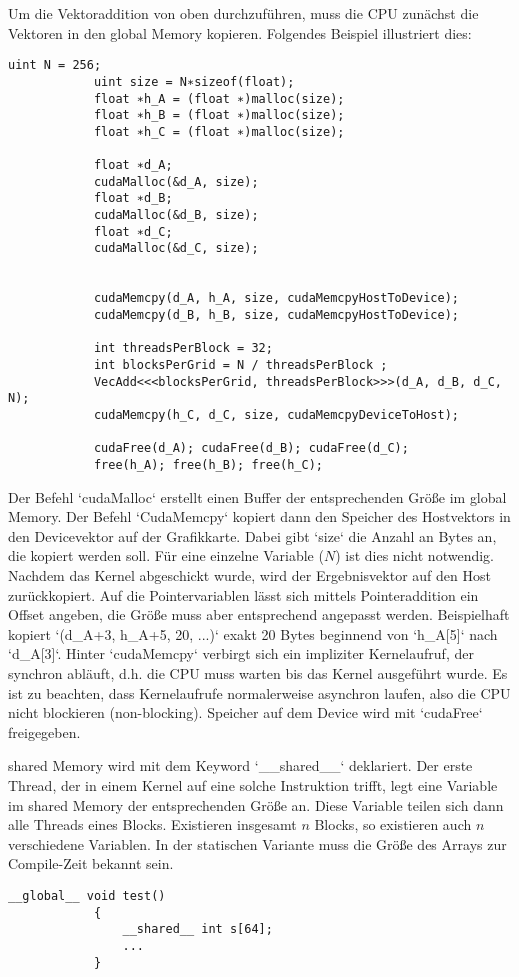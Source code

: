 		\newpage
		
		Um die Vektoraddition von oben durchzuführen, muss die CPU zunächst die Vektoren in den \Gls{global Memory} kopieren. Folgendes Beispiel illustriert dies:		
		\begin{lstlisting}[caption=~Vektoraddition Host]
			uint N = 256;
			uint size = N∗sizeof(float);
			float ∗h_A = (float ∗)malloc(size);
			float ∗h_B = (float ∗)malloc(size);
			float ∗h_C = (float ∗)malloc(size);

			float ∗d_A;
			cudaMalloc(&d_A, size);
			float ∗d_B;
			cudaMalloc(&d_B, size);
			float ∗d_C;
			cudaMalloc(&d_C, size);
			
			
			cudaMemcpy(d_A, h_A, size, cudaMemcpyHostToDevice);
			cudaMemcpy(d_B, h_B, size, cudaMemcpyHostToDevice);

			int threadsPerBlock = 32;
			int blocksPerGrid = N / threadsPerBlock ;
			VecAdd<<<blocksPerGrid, threadsPerBlock>>>(d_A, d_B, d_C, N);
			cudaMemcpy(h_C, d_C, size, cudaMemcpyDeviceToHost);
			
			cudaFree(d_A); cudaFree(d_B); cudaFree(d_C);
			free(h_A); free(h_B); free(h_C);
		\end{lstlisting}	
		
		Der Befehl \li`cudaMalloc` erstellt einen Buffer der entsprechenden Größe im \Gls{global Memory}.
		Der Befehl \li`CudaMemcpy` kopiert dann den Speicher des Hostvektors in den Devicevektor auf der Grafikkarte. Dabei gibt \li`size` die Anzahl an Bytes an, die kopiert werden soll. Für eine einzelne Variable ($N$) ist dies nicht notwendig.
		Nachdem das Kernel abgeschickt wurde, wird der Ergebnisvektor auf den Host zurückkopiert. Auf die Pointervariablen lässt sich mittels Pointeraddition ein Offset angeben, die Größe muss aber entsprechend angepasst werden. Beispielhaft kopiert \li`(d_A+3, h_A+5, 20, ...)` exakt 20 Bytes beginnend von \li`h_A[5]` nach \li`d_A[3]`.
		Hinter \li`cudaMemcpy` verbirgt sich ein impliziter \Gls{Kernel}aufruf, der synchron abläuft, d.h. die CPU muss warten bis das \Gls{Kernel} ausgeführt wurde. Es ist zu beachten, dass \Gls{Kernel}aufrufe normalerweise asynchron laufen, also die CPU nicht blockieren (non-blocking). 
		Speicher auf dem Device wird mit \li`cudaFree` freigegeben.
		
		\Gls{shared Memory} wird mit dem Keyword \li`__shared__` deklariert. Der erste \Gls{Thread}, der in einem \Gls{Kernel} auf eine solche Instruktion trifft, legt eine Variable im \gls{shared Memory} der entsprechenden Größe an. Diese Variable teilen sich dann alle \Glspl{Thread} eines \Gls{Block}s. Existieren insgesamt $n$ \Glspl{Block}, so existieren auch $n$ verschiedene Variablen. In der statischen Variante muss die Größe des Arrays zur Compile-Zeit bekannt sein.
		\begin{lstlisting}[caption=~shared Memory statisch]
			__global__ void test()
			{
  				__shared__ int s[64];
  				...
			}
  		\end{lstlisting}

